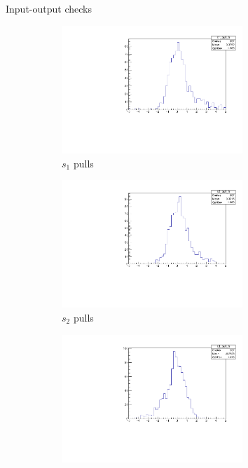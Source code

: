 \documentclass{beamer}
\begin{document}
\begin{frame}{Input-output checks}
  \begin{figure}
    \centering
    \begin{subfigure}{0.5\textwidth}
      \centering
      \includegraphics[width=0.75\textwidth]{Plots/s1_ToyFits_pull.pdf}
      \caption{$s_1$ pulls}
    \end{subfigure}%
    \begin{subfigure}{0.5\textwidth}
      \centering
      \includegraphics[width=0.75\textwidth]{Plots/s2_ToyFits_pull.pdf}
      \caption{$s_2$ pulls}
    \end{subfigure}
    \begin{subfigure}{0.5\textwidth}
      \centering
      \includegraphics[width=0.75\textwidth]{Plots/s3_ToyFits_pull.pdf}

\end{subfigure}
\end{figure}
\end{frame}
\end{document}
